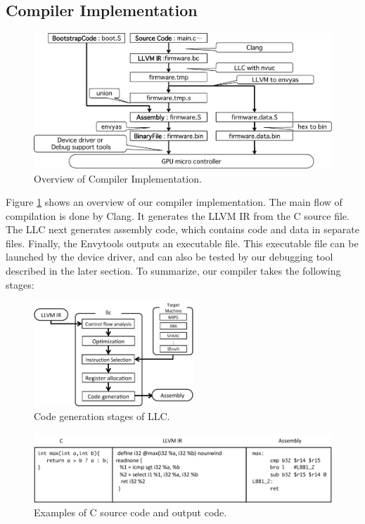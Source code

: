 \subsection{Compiler Implementation}

\begin{figure}
\begin{center}
\includegraphics[width=12cm]{./img/step_compiler.pdf}
\end{center}
\caption{Overview of Compiler Implementation.}
\label{fig:compiler}
\end{figure}

Figure \ref{fig:compiler} shows an overview of our compiler
implementation.
The main flow of compilation is done by Clang.
It generates the LLVM IR from the C source file.
The LLC next generates assembly code, which contains code and data in
separate files.
Finally, the Envytools outputs an executable file.
This executable file can be launched by the device driver, and can also
be tested by our debugging tool described in the later section.
To summarize, our compiler takes the following stages:

\begin{figure}
 \begin{center}
  \includegraphics[width=6cm]{./img/llc.pdf}
 \end{center}
 \caption{Code generation stages of LLC.}
 \label{fig:llc}
\end{figure}

\begin{figure}
 \begin{center}
  \includegraphics[width=12cm]{./img/llvm_code.pdf}
 \end{center}
 \caption{Examples of C source code and output code.}
 \label{fig:llvm_code}
\end{figure}

